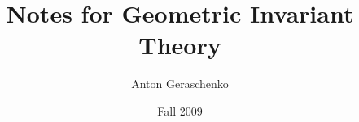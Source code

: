 

{

\title{\vspace*{-2cm} Notes for Geometric Invariant Theory \vspace*{-2mm}}
\author{Anton Geraschenko}
\date{Fall 2009}
\maketitle
{}    %
\tableofcontents

}{
}{
}{
}{
}{
}{
}{
}{
}{
}{
}{
}{
}{
}{
}{
}{
}{
}{
}{
}{
}{
}{
}{
}{
}{
}{
}{
}{
}{
}{
}{
}{
}{
}{
}{
}{
}{
}{
}{

 

}
